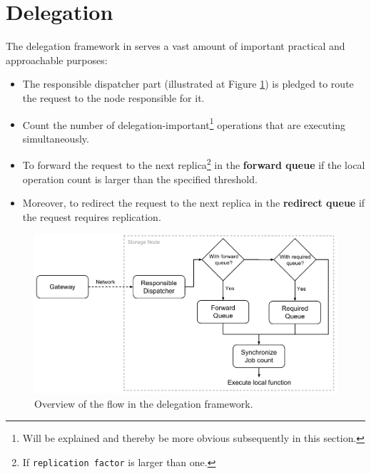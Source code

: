 \section{Delegation} \label{sec:delegation}
The delegation framework in \CodeName serves a vast amount of important practical and approachable purposes:
\begin{itemize}
	\item The responsible dispatcher part (illustrated at Figure \ref{fig:delegation-framework}) is pledged to route the request to the node responsible for it.
	\item Count the number of delegation-important\footnote{\label{note:explained}Will be explained and thereby be more obvious subsequently in this section.} operations that are executing simultaneously.
	\item To forward the request to the next replica\footnote{\label{note:replication-factor}If \texttt{replication factor} is larger than one.} in the \textbf{forward queue} if the local operation count is larger than the specified threshold.
	\item Moreover, to redirect the request to the next replica in the \textbf{redirect queue} if the request requires replication.
\end{itemize}
\vspace*{4mm}

\begin{figure}[ht!]
	\centering
	\vspace*{5mm}
	\includegraphics[scale=0.8]{pdf/delegation-framework.pdf}
	\caption[Overview of the delegation framework]{Overview of the flow in the delegation framework. \label{fig:delegation-framework}}
	\vspace*{5mm}
\end{figure}	

